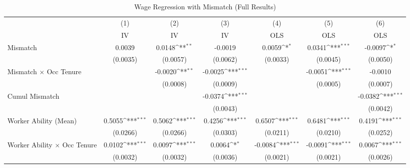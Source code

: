 {
\def\sym#1{\ifmmode^{#1}\else\(^{#1}\)\fi}
\begin{longtable}{l*{6}{c}}
\caption{Wage Regression with Mismatch (Full Results)}\\
\hline  \endfirsthead\hline  \endhead\hline  \endfoot\endlastfoot
                    &\multicolumn{1}{c}{(1)}&\multicolumn{1}{c}{(2)}&\multicolumn{1}{c}{(3)}&\multicolumn{1}{c}{(4)}&\multicolumn{1}{c}{(5)}&\multicolumn{1}{c}{(6)}\\
                    &\multicolumn{1}{c}{IV}&\multicolumn{1}{c}{IV}&\multicolumn{1}{c}{IV}&\multicolumn{1}{c}{OLS}&\multicolumn{1}{c}{OLS}&\multicolumn{1}{c}{OLS}\\
\hline  
Mismatch            &      0.0039         &      0.0148\sym{**} &     -0.0019         &      0.0059\sym{*}  &      0.0341\sym{***}&     -0.0097\sym{*}  \\
                    &    (0.0035)         &    (0.0057)         &    (0.0062)         &    (0.0033)         &    (0.0045)         &    (0.0050)         \\
Mismatch $\times$ Occ Tenure&                     &     -0.0020\sym{**} &     -0.0025\sym{***}&                     &     -0.0051\sym{***}&     -0.0010         \\
                    &                     &    (0.0008)         &    (0.0009)         &                     &    (0.0005)         &    (0.0007)         \\
Cumul Mismatch      &                     &                     &     -0.0374\sym{***}&                     &                     &     -0.0382\sym{***}\\
                    &                     &                     &    (0.0043)         &                     &                     &    (0.0042)         \\
Worker Ability (Mean)&      0.5055\sym{***}&      0.5062\sym{***}&      0.4256\sym{***}&      0.6507\sym{***}&      0.6481\sym{***}&      0.4191\sym{***}\\
                    &    (0.0266)         &    (0.0266)         &    (0.0303)         &    (0.0211)         &    (0.0210)         &    (0.0252)         \\
Worker Ability $\times$ Occ Tenure&      0.0102\sym{***}&      0.0097\sym{***}&      0.0064\sym{*}  &     -0.0084\sym{***}&     -0.0091\sym{***}&      0.0067\sym{***}\\
                    &    (0.0032)         &    (0.0032)         &    (0.0036)         &    (0.0021)         &    (0.0021)         &    (0.0026)         \\

\end{longtable}}
